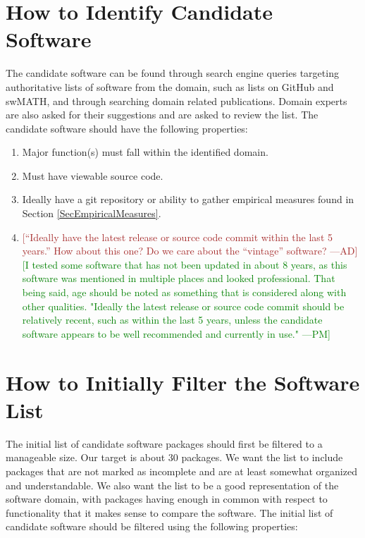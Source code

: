 \documentclass[letterpaper,cleveref]{lipics-v2019}
\newcommand{\authornote}[3]{\textcolor{#1}{[#3 ---#2]}}
\newcommand{\authornote}[3]{}
\newcommand{\pmi}[1]{\authornote{green}{PM}{#1}} %
\newcommand{\ad}[1]{\authornote{brown}{AD}{#1}} %
\theoremstyle{definition}
\begin{document}
\section{How to Identify Candidate Software} \label{SecIdentifyCandSoft}
The candidate software can be found through search engine queries targeting authoritative lists of software from the domain, such as lists on GitHub and swMATH, and through searching domain related publications. Domain experts are also asked for their suggestions and are asked to review the list. The candidate software should have the following properties:

\begin{enumerate}
	\item Major function(s) must fall within the identified domain.
	\item Must have viewable source code.
	\item Ideally have a git repository or ability to gather empirical measures found in Section \ref{SecEmpiricalMeasures}.
	\item \ad{``Ideally have the latest release or source code commit within the last 5 years.'' How about this one? Do we care about the ``vintage'' software?}\pmi{I tested some software that has not been updated in about 8 years, as this software was mentioned in multiple places and looked professional. That being said, age should be noted as something that is considered along with other qualities. "Ideally the latest release or source code commit should be relatively recent, such as within the last 5 years, unless the candidate software appears to be well recommended and currently in use."}
\end{enumerate}

\section{How to Initially Filter the Software List} \label{SecInitialFilter}
The initial list of candidate software packages should first be filtered to a manageable size. Our target is about 30 packages. We want the list to include packages that are not marked as incomplete and are at least somewhat organized and understandable. We also want the list to be a good representation of the software domain, with packages having enough in common with respect to functionality that it makes sense to compare the software. The initial list of candidate software should be filtered using the following properties:
\end{document}
